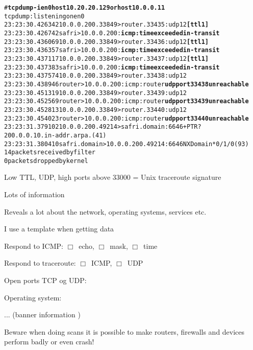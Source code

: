 \documentclass[20pt,landscape,a4paper,footrule]{foils}
\begin{document}
\begin{alltt}
\footnotesize # {\bfseries tcpdump -i en0 host 10.20.20.129 or host 10.0.0.11}
tcpdump: listening on en0
23:23:30.426342 10.0.0.200.33849 > router.33435: udp 12 {\bf [ttl 1]}
23:23:30.426742 safri > 10.0.0.200: {\bf icmp: time exceeded in-transit}
23:23:30.436069 10.0.0.200.33849 > router.33436: udp 12 {\bf [ttl 1]}
23:23:30.436357 safri > 10.0.0.200: {\bf icmp: time exceeded in-transit}
23:23:30.437117 10.0.0.200.33849 > router.33437: udp 12 {\bf [ttl 1]}
23:23:30.437383 safri > 10.0.0.200: {\bf icmp: time exceeded in-transit}
23:23:30.437574 10.0.0.200.33849 > router.33438: udp 12
23:23:30.438946 router > 10.0.0.200: icmp: router {\bf udp port 33438 unreachable}
23:23:30.451319 10.0.0.200.33849 > router.33439: udp 12
23:23:30.452569 router > 10.0.0.200: icmp: router {\bf udp port 33439 unreachable}
23:23:30.452813 10.0.0.200.33849 > router.33440: udp 12
23:23:30.454023 router > 10.0.0.200: icmp: router {\bf udp port 33440 unreachable}
23:23:31.379102 10.0.0.200.49214 > safri.domain:  6646+ PTR?
200.0.0.10.in-addr.arpa. (41)
23:23:31.380410 safri.domain > 10.0.0.200.49214:  6646 NXDomain* 0/1/0 (93)
14 packets received by filter
0 packets dropped by kernel
\end{alltt}

\vskip 5mm
\centerline{Low TTL, UDP, high ports above 33000 = Unix traceroute signature}



\begin{list1}
\item Lots of information
\item Reveals a lot about the network, operating systems, services etc.
\item I use a template when getting data
  \begin{list2}
    \item Respond to ICMP: $\Box$\  echo, $\Box$\ mask, $\Box$\ time
\item Respond to traceroute: $\Box$\ ICMP, $\Box$\ UDP
\item Open ports TCP og UDP:
\item Operating system:
\item ... (banner information )
  \end{list2}
\item Beware when doing scans it is possible to make routers, firewalls and devices perform badly or even crash!
\end{list1}
\end{document}

